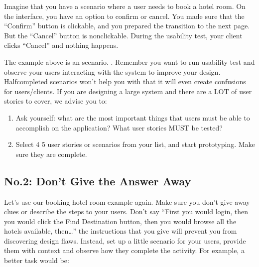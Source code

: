 \documentclass[letterpaper,10pt,english]{jupyterBook}
\begin{document}
\sphinxAtStartPar
Imagine that you have a scenario where a user needs to book a hotel room.  On the interface, you have an option to
confirm or cancel. You made sure that the “Confirm” button is clickable, and you prepared the transition to the
next page.  But the “Cancel” button is non\sphinxhyphen{}clickable. During the usability test, your client clicks “Cancel” and
nothing happens.

\sphinxAtStartPar
The example above is an  scenario. .  Remember \sphinxhyphen{} you want to run usability test and observe your users
interacting with the system to improve your design. Half\sphinxhyphen{}completed scenarios won’t help you with that \sphinxhyphen{} it will even
create confusions for users/clients. If you are designing a large system and there are a LOT of user stories to
cover, we advise you to:
\begin{enumerate}
%
\item {} 
\sphinxAtStartPar
Ask yourself: what are the most important things that users must be able to accomplish on the application?
What user stories MUST be tested?

\item {} 
\sphinxAtStartPar
Select 4 \sphinxhyphen{} 5 user stories or scenarios from your list, and start prototyping. Make sure they are complete.

\end{enumerate}


\subsection{No.2: Don’t Give the Answer Away}
\label{\detokenize{appendices/appendix_e/marvel_guide:no-2-don-t-give-the-answer-away}}
\sphinxAtStartPar
Let’s use our booking hotel room example again. Make sure you don’t give away clues or describe the steps to your
users. Don’t say “First you would login, then you would click the Find Destination button, then you would browse
all the hotels available, then…” the instructions that you give will prevent you from discovering design flaws.
Instead, set up a little scenario for your users, provide them with context and observe how they complete the
activity. For example, a better task would be:

\sphinxAtStartPar
{}
\end{document}
